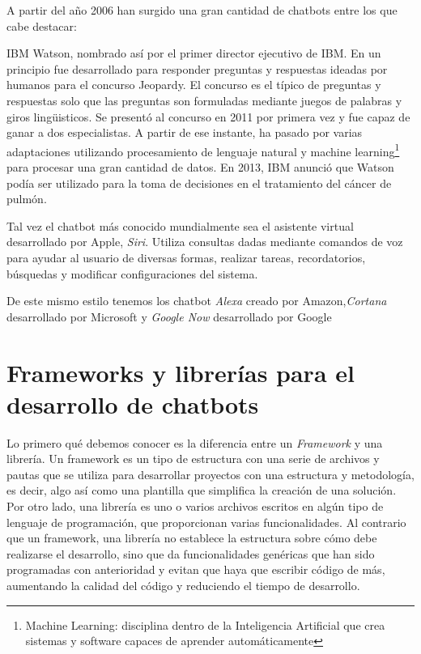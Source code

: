A partir del año 2006 han surgido una gran cantidad de chatbots entre los que cabe destacar:

IBM Watson, nombrado así por el primer director ejecutivo de IBM. En un principio fue desarrollado para responder preguntas y respuestas ideadas por humanos para el concurso Jeopardy. El concurso es el típico de preguntas y respuestas solo que las preguntas son formuladas mediante juegos de palabras y giros lingüisticos. Se presentó al concurso en 2011 por primera vez y fue capaz de ganar a dos especialistas. A partir de ese instante, ha pasado por varias adaptaciones utilizando procesamiento de lenguaje natural y machine learning\footnote{Machine Learning: disciplina dentro de la Inteligencia Artificial que crea sistemas y software capaces de aprender automáticamente} para procesar una gran cantidad de datos. En 2013, IBM anunció que Watson podía ser utilizado para la toma de decisiones en el tratamiento del cáncer de pulmón. 

Tal vez el chatbot más conocido mundialmente sea el asistente virtual desarrollado por Apple, \textit{Siri}. Utiliza consultas dadas mediante comandos de voz para ayudar al usuario de diversas formas, realizar tareas, recordatorios, búsquedas y modificar configuraciones del sistema.

De este mismo estilo tenemos los chatbot \textit{Alexa} creado por Amazon,\textit{Cortana} desarrollado por Microsoft y \textit{Google Now} desarrollado por Google


\section{Frameworks y librerías para el desarrollo de chatbots}

Lo primero qué debemos conocer es la diferencia entre un \textit{Framework} y una librería. Un framework es un tipo de estructura con una serie de archivos y pautas que se utiliza para desarrollar proyectos con una estructura y metodología, es decir, algo así como una plantilla que simplifica la creación de una solución. 
Por otro lado, una librería es uno o varios archivos escritos en algún tipo de lenguaje de programación, que proporcionan varias funcionalidades. Al contrario que un framework, una librería no establece la estructura sobre cómo debe realizarse el desarrollo, sino que da funcionalidades genéricas que han sido programadas con anterioridad y evitan que haya que escribir código de más, aumentando la calidad del código y reduciendo el tiempo de desarrollo.


